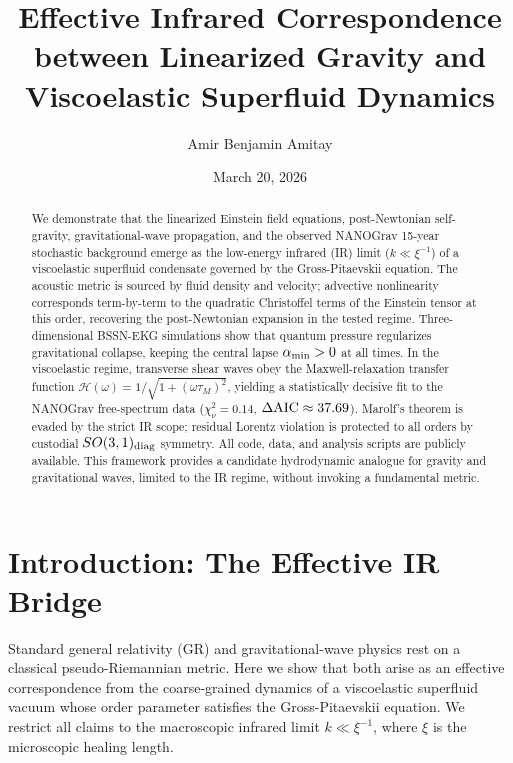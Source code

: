 \documentclass[reprint,amsmath,amssymb,aps,prl,superscriptaddress]{revtex4-2}
\begin{document}
\title{Effective Infrared Correspondence between Linearized Gravity and Viscoelastic Superfluid Dynamics}

\author{Amir Benjamin Amitay}
\date{March 20, 2026}

\begin{abstract}
We demonstrate that the linearized Einstein field equations, post-Newtonian self-gravity, gravitational-wave propagation, and the observed NANOGrav 15-year stochastic background emerge as the low-energy infrared (IR) limit ($k\ll\xi^{-1}$) of a viscoelastic superfluid condensate governed by the Gross-Pitaevskii equation. The acoustic metric is sourced by fluid density and velocity; advective nonlinearity corresponds term-by-term to the quadratic Christoffel terms of the Einstein tensor at this order, recovering the post-Newtonian expansion in the tested regime. Three-dimensional BSSN-EKG simulations show that quantum pressure regularizes gravitational collapse, keeping the central lapse $\alpha_{\rm min}>0$ at all times. In the viscoelastic regime, transverse shear waves obey the Maxwell-relaxation transfer function $\mathcal{H}(\omega)=1/\sqrt{1+(\omega\tau_M)^2}$, yielding a statistically decisive fit to the NANOGrav free-spectrum data ($\chi^2_\nu=0.14$, $\Delta{\rm AIC}\approx37.69$). Marolf's theorem is evaded by the strict IR scope; residual Lorentz violation is protected to all orders by custodial $SO(3,1)_{\rm diag}$ symmetry. All code, data, and analysis scripts are publicly available. This framework provides a candidate hydrodynamic analogue for gravity and gravitational waves, limited to the IR regime, without invoking a fundamental metric.
\end{abstract}

\maketitle

\section{Introduction: The Effective IR Bridge}
\label{sec:intro}

Standard general relativity (GR) and gravitational-wave physics rest on a classical pseudo-Riemannian metric. Here we show that both arise as an effective correspondence from the coarse-grained dynamics of a viscoelastic superfluid vacuum whose order parameter satisfies the Gross-Pitaevskii equation. We restrict all claims to the macroscopic infrared limit $k\ll\xi^{-1}$, where $\xi$ is the microscopic healing length.
\end{document}
